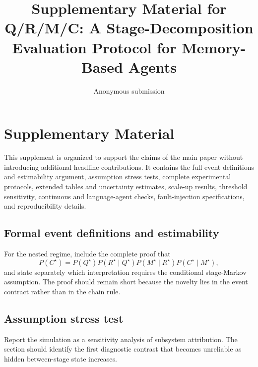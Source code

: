 \documentclass[letterpaper]{article}
\title{Supplementary Material for\\Q/R/M/C: A Stage-Decomposition Evaluation Protocol for Memory-Based Agents}
\author{Anonymous submission}
\begin{document}
\maketitle

\section{Supplementary Material}

This supplement is organized to support the claims of the main paper without introducing additional headline contributions. It contains the full event definitions and estimability argument, assumption stress tests, complete experimental protocols, extended tables and uncertainty estimates, scale-up results, threshold sensitivity, continuous and language-agent checks, fault-injection specifications, and reproducibility details.

\subsection{Formal event definitions and estimability}


For the nested regime, include the complete proof that
\begin{equation}
P(C^\star)=P(Q^\star)P(R^\star\mid Q^\star)
P(M^\star\mid R^\star)P(C^\star\mid M^\star),
\end{equation}
and state separately which interpretation requires the conditional stage-Markov assumption. The proof should remain short because the novelty lies in the event contract rather than in the chain rule.

\subsection{Assumption stress test}


Report the simulation as a sensitivity analysis of subsystem attribution. The section should identify the first diagnostic contrast that becomes unreliable as hidden between-stage state increases.
\end{document}

